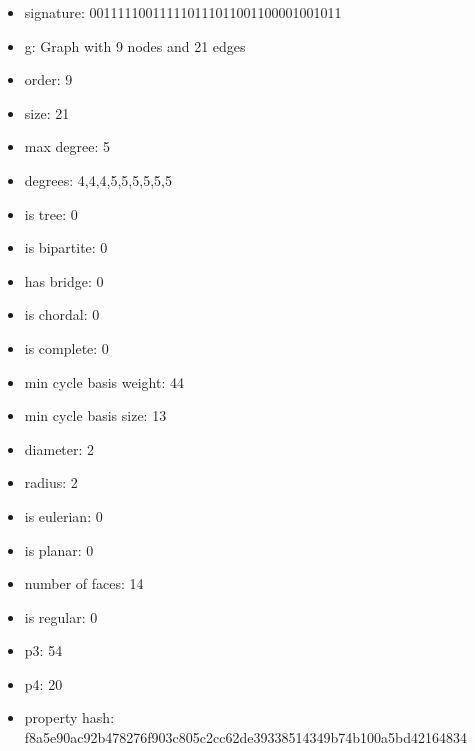 \newpage
\begin{figure}
\end{figure}
\begin{itemize}
\item signature: 001111100111110111011001100001001011
\item g: Graph with 9 nodes and 21 edges
\item order: 9
\item size: 21
\item max degree: 5
\item degrees: 4,4,4,5,5,5,5,5,5
\item is tree: 0
\item is bipartite: 0
\item has bridge: 0
\item is chordal: 0
\item is complete: 0
\item min cycle basis weight: 44
\item min cycle basis size: 13
\item diameter: 2
\item radius: 2
\item is eulerian: 0
\item is planar: 0
\item number of faces: 14
\item is regular: 0
\item p3: 54
\item p4: 20
\item property hash: f8a5e90ac92b478276f903c805c2cc62de39338514349b74b100a5bd42164834
\end{itemize}
